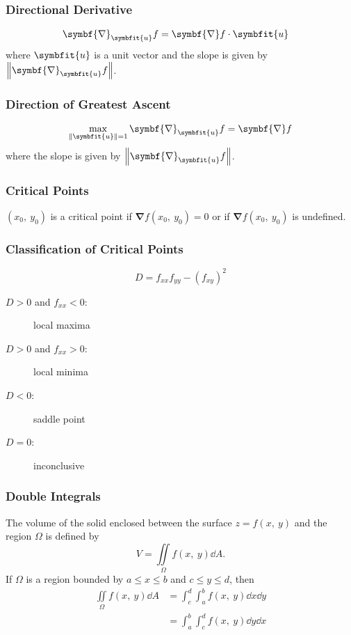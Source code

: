 \documentclass{article}
\begin{document}
\begin{multicols}{3}
    \subsubsection*{Directional Derivative}
    \begin{align*}
        \symbf{\nabla}_{\symbfit{u}}f
         & = \symbf{\nabla}f \cdot \symbfit{u}
    \end{align*}
    where $\symbfit{u}$ is a unit vector and the slope is given by $\norm{\symbf{\nabla}_{\symbfit{u}}f}$.
    \subsubsection*{Direction of Greatest Ascent}
    \begin{align*}
        \max_{\norm{\symbfit{u}} = 1} \symbf{\nabla}_{\symbfit{u}}f = \symbf{\nabla}f
    \end{align*}
    where the slope is given by $\norm{\symbf{\nabla}_{\symbfit{u}}f}$.
    \subsubsection*{Critical Points}
    $(x_0,\: y_0)$ is a critical point if $\symbf{\nabla}f(x_0,\: y_0) = 0$
    or if $\symbf{\nabla}f(x_0,\: y_0)$ is undefined.
    \subsubsection*{Classification of Critical Points}
    \begin{equation*}
        D = f_{xx}f_{yy} - \left( f_{xy} \right)^2
    \end{equation*}
    \begin{description}
        \item[$D > 0$ and $f_{xx} < 0$:] local maxima
        \item[$D > 0$ and $f_{xx} > 0$:] local minima
        \item[$D < 0$:] saddle point
        \item[$D = 0$:] inconclusive
    \end{description}
    \subsubsection*{Double Integrals}
    The volume of the solid
    enclosed between the surface $z=f(x,\: y)$ and the region $\Omega$ is
    defined by
    \begin{equation*}
        V = \iint\limits_{\Omega} f(x,\: y) \dd{A}.
    \end{equation*}
    If $\Omega$ is a region bounded by $a \leq x \leq b$ and $c \leq y \leq d$, then
    \begin{align*}
        \iint\limits_{\Omega} f(x,\: y) \dd{A} & = \int_c^d\int_a^b f(x,\: y) \dd{x} \dd{y} \\
                                               & = \int_a^b\int_c^d f(x,\: y) \dd{y} \dd{x}
    \end{align*}

\end{multicols}
\end{document}
